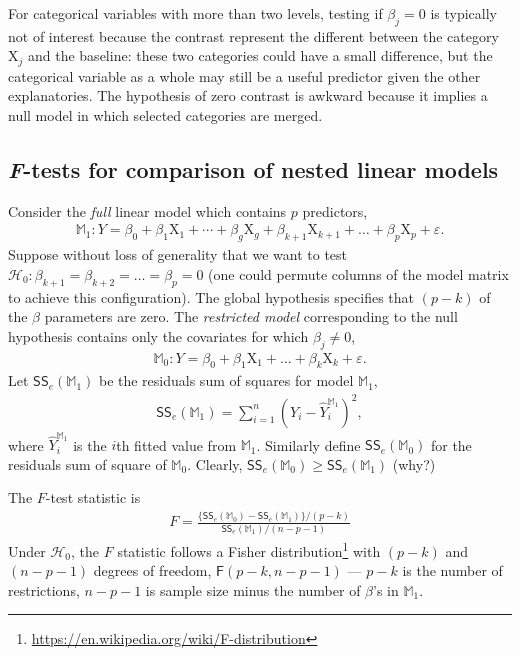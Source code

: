 \documentclass[
  11pt,
  letterpaper,
]{book}
\renewcommand{\href}[2]{#2\footnote{\url{#1}}}
\theoremstyle{definition}
\theoremstyle{definition}
\theoremstyle{definition}
\theoremstyle{definition}
\theoremstyle{remark}
\begin{document}
For categorical variables with more than two levels, testing if \(\beta_j=0\) is typically not of interest because the contrast represent the different between the category \(\mathrm{X}_j\) and the baseline: these two categories could have a small difference, but the categorical variable as a whole may still be a useful predictor given the other explanatories. The hypothesis of zero contrast is awkward because it implies a null model in which selected categories are merged.

\hypertarget{ftestslm}{%
\subsection{\texorpdfstring{\emph{F}-tests for comparison of nested linear models}{F-tests for comparison of nested linear models}}\label{ftestslm}}

Consider the \emph{full} linear model which contains \(p\) predictors,
\begin{align*}
\mathbb{M}_1: Y=\beta_0+\beta_1 \mathrm{X}_1 + \cdots + \beta_g \mathrm{X}_g + \beta_{k+1}\mathrm{X}_{k+1} + \ldots + \beta_p \mathrm{X}_p + \varepsilon.
\end{align*}
Suppose without loss of generality that we want to test \(\mathscr{H}_0: \beta_{k+1}=\beta_{k+2}=\ldots=\beta_p=0\) (one could permute columns of the model matrix to achieve this configuration).
The global hypothesis specifies that \((p-k)\) of the \(\beta\) parameters are zero. The \emph{restricted model} corresponding to the null hypothesis contains only the covariates for which \(\beta_j \neq 0\),
\begin{align*}
\mathbb{M}_0: Y=\beta_0+\beta_1 \mathrm{X}_1 + \ldots + \beta_k \mathrm{X}_k + \varepsilon.
\end{align*}
Let \(\mathsf{SS}_e(\mathbb{M}_1)\) be the residuals sum of squares for model \(\mathbb{M}_1\),
\begin{align*}
\mathsf{SS}_e(\mathbb{M}_1)=\sum_{i=1}^n (Y_i-\widehat{Y}_i^{\mathbb{M}_1})^2,
\end{align*}
where \(\widehat{Y}_i^{\mathbb{M}_1}\) is the \(i\)th fitted value from \(\mathbb{M}_1\). Similarly define \(\mathsf{SS}_e(\mathbb{M}_0)\) for the residuals sum of square of \(\mathbb{M}_0\). Clearly, \(\mathsf{SS}_e(\mathbb{M}_0) \geq \mathsf{SS}_e(\mathbb{M}_1)\) (why?)

The \(F\)-test statistic is
\begin{align*}
F=\frac{\{\mathsf{SS}_e(\mathbb{M}_0)-\mathsf{SS}_e(\mathbb{M}_1)\}/(p-k)}{\mathsf{SS}_e(\mathbb{M}_1)/(n-p-1)}
\end{align*}
Under \(\mathscr{H}_0\), the \(F\) statistic follows a \href{https://en.wikipedia.org/wiki/F-distribution}{Fisher distribution} with \((p-k)\) and \((n-p-1)\) degrees of freedom, \(\mathsf{F}(p-k, n-p-1)\) --- \(p-k\) is the number of restrictions, \(n-p-1\) is sample size minus the number of \(\beta\)'s in \(\mathbb{M}_1\).
\end{document}
